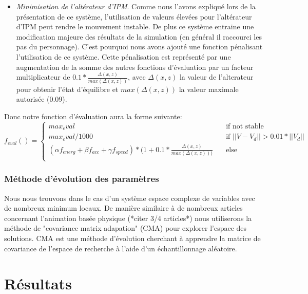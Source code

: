 \documentclass{llncs}
\begin{document}
\begin{itemize}
\item{\textit{Minimisation de l'altérateur d'IPM}. Comme nous l'avons expliqué lors de la présentation de ce système, l'utilisation de valeurs élevées pour l'altérateur d'IPM peut rendre le mouvement instable. De plus ce système entraine une modification majeure des résultats de la simulation (en général il raccourci les pas du personnage). C'est pourquoi nous avons ajouté une fonction pénalisant l'utilisation de ce système. Cette pénalisation est représenté par une augmentation de la somme des autres fonctions d'évaluation par un facteur multiplicateur de $0.1*\frac{\Delta(x,z)}{max(\Delta(x,z))}$, avec $\Delta(x,z)$ la valeur de l'alterateur pour obtenir l'état d'équilibre et $max(\Delta(x,z))$ la valeur maximale autorisée (0.09).}
\end{itemize}

Donc notre fonction d'évaluation aura la forme suivante:
$$
f_{eval}() =
  \begin{cases}
    max_eval       & \quad \text{if not stable} \\
    max_eval/1000       & \quad \text{if } ||V-V_d||>0.01*||V_d|| \\
   (\alpha f_{energ} + \beta f_{acc} + \gamma f_{speed})*(1+0.1*\frac{\Delta(x,z)}{max(\Delta(x,z)))} & \quad \text{else}\\
  \end{cases}
$$
%
\subsubsection{Méthode d'évolution des paramètres}
Nous nous trouvons dans le cas d'un système espace complexe de variables avec de nombreux minimum locaux. De manière similaire à de nombreux articles concernant l'animation basée physique (*citer 3/4 articles*) nous utiliserons la méthode de "covariance matrix adapation" (CMA) \cite{hansen2006cma} pour explorer l'espace des solutions. CMA est une méthode d'évolution cherchant à apprendre la matrice de covariance de l'espace de recherche à l'aide d'un échantillonnage aléatoire.




%
\section{Résultats}
%
\end{document}
